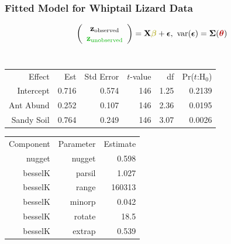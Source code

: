 \documentclass[mathserif,compress]{beamer}\usepackage{graphicx, color}
\def\bz{\mathbf{z}}
\def\bX{\mathbf{X}}
\def\bbeta{\mbox{\boldmath $\beta$}}
\def\bepsilon{\mbox{\boldmath $\epsilon$}}
\def\btheta{\mbox{\boldmath $\theta$}}
\def\bSigma{\mbox{\boldmath $\Sigma$}}
\def\var{\textrm{var}}
\newcommand{\cye}[1]{\color{yellow!70!black}#1}
\newcommand{\cre}[1]{\color{red!70!black}#1}
\begin{document}
\begin{frame}[fragile]
\frametitle{Fitted Model for Whiptail Lizard Data}



	
		 \[
			\left(\begin{array}{c}	
					\bz_{\textrm{observed}} \\
					{\color{green!70!black} \bz_{\textrm{unobserved}}}
			\end{array} \right) =  \bX{\color{yellow!70!black}\bbeta} + 
			\bepsilon, \ \var(\bepsilon) = \bSigma({\color{red!70!black}\btheta}) \] \\




	\begin{table}[ht]
	\centering
	\begin{tabular}{rrrrrr}
	 Effect & Est & Std Error & $t$-value & df & Pr($t$:H$_0$) \\ 
		\cye{Intercept} & \cye{0.716} & \cye{0.574} & \cye{146} & \cye{1.25} & \cye{0.2139} \\ 
		\cye{Ant Abund} & \cye{0.252} & \cye{0.107} & \cye{146} & \cye{2.36} & \cye{0.0195} \\ 
		\cye{Sandy Soil} & \cye{0.764} & \cye{0.249} & \cye{146} & \cye{3.07} & \cye{0.0026} \\ 
	\end{tabular}
	\end{table}




\scriptsize

	\begin{table}[ht]
	\centering
	\begin{tabular}{rrr}
	Component & Parameter & Estimate \\ 
	\cre{nugget} & \cre{nugget} & \cre{0.598} \\ 
	\cre{besselK} & \cre{parsil} & \cre{1.027} \\ 
	\cre{besselK} & \cre{range} & \cre{160313} \\ 
	\cre{besselK} & \cre{minorp} & \cre{0.042} \\ 
	\cre{besselK} & \cre{rotate} & \cre{18.5} \\ 
	\cre{besselK} & \cre{extrap} & \cre{0.539} \\ 
	\end{tabular}
	\end{table}


\end{frame}
	
\end{document}
